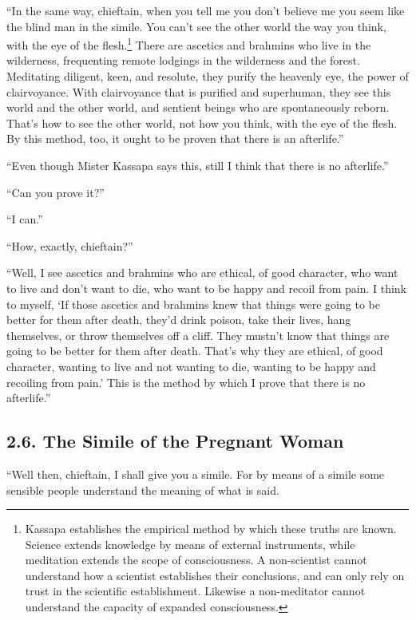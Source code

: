 \documentclass[12pt,openany]{book}%
\begin{document}
“In the same way, chieftain, when you tell me you don’t believe me you seem like the blind man in the simile. You can’t see the other world the way you think, with the eye of the flesh.\footnote{Kassapa establishes the empirical method by which these truths are known. Science extends knowledge by means of external instruments, while meditation extends the scope of consciousness. A non-scientist cannot understand how a scientist establishes their conclusions, and can only rely on trust in the scientific establishment. Likewise a non-meditator cannot understand the capacity of expanded consciousness. } There are ascetics and brahmins who live in the wilderness, frequenting remote lodgings in the wilderness and the forest. Meditating diligent, keen, and resolute, they purify the heavenly eye, the power of clairvoyance. With clairvoyance that is purified and superhuman, they see this world and the other world, and sentient beings who are spontaneously reborn. That’s how to see the other world, not how you think, with the eye of the flesh. By this method, too, it ought to be proven that there is an afterlife.” 

“Even though Mister Kassapa says this, still I think that there is no afterlife.” 

“Can you prove it?” 

“I can.” 

“How, exactly, chieftain?” 

“Well, I see ascetics and brahmins who are ethical, of good character, who want to live and don’t want to die, who want to be happy and recoil from pain. I think to myself, ‘If those ascetics and brahmins knew that things were going to be better for them after death, they’d drink poison, take their lives, hang themselves, or throw themselves off a cliff. They mustn’t know that things are going to be better for them after death. That’s why they are ethical, of good character, wanting to live and not wanting to die, wanting to be happy and recoiling from pain.’ This is the method by which I prove that there is no afterlife.” 

\subsection*{2.6. The Simile of the Pregnant Woman }

“Well then, chieftain, I shall give you a simile. For by means of a simile some sensible people understand the meaning of what is said. 
\end{document}
